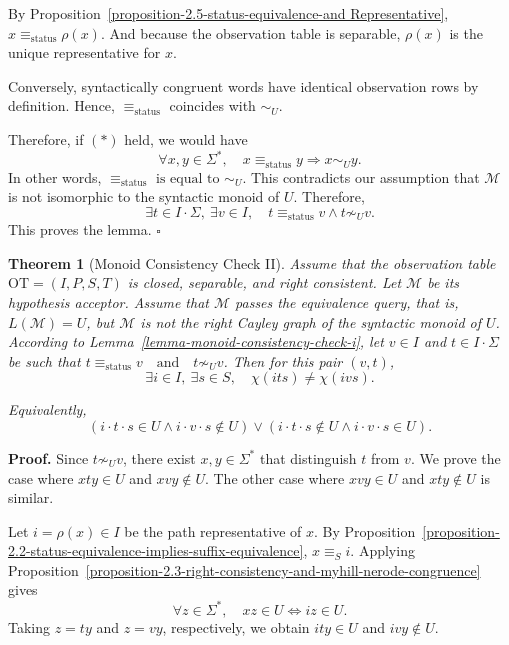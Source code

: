 \documentclass{ieice-tecrep}
\newtheorem{theorem}{Theorem}
\begin{document}
By Proposition~\ref{proposition-2.5-status-equivalence-and Representative}, \(x \equiv_{\mathrm{status}} \rho(x)\). And because the observation table is separable, \(\rho(x)\) is the
unique representative for \(x\).

Conversely, syntactically congruent words have identical observation rows by definition.
Hence, \(\equiv_{\mathrm{status}}\) coincides with \(\sim_U\).

Therefore, if \((*)\) held, we would have
\[
\forall x,y \in \Sigma^*,\quad x \equiv_{\mathrm{status}} y \Longrightarrow x \sim_U y.
\]
In other words, \(\equiv_{\mathrm{status}}\text{ is equal to }\sim_U\). 
This contradicts our assumption that \(\mathcal{M}\) is not isomorphic to the 
syntactic monoid of \(U\). 
Therefore,
\[
\exists t\in I\cdot\Sigma,\ \exists v\in I,\quad
t\equiv_{\mathrm{status}}v\land t\not\sim_U v.
\]
This proves the lemma. \hfill $\square$

\begin{theorem}[Monoid Consistency Check II]\label{theorem-monoid-consistency-check-ii}
Assume that the observation table
\(\mathrm{OT}=(I,P,S,T)\) is closed, separable, and right consistent.
Let \(\mathcal{M}\) be its hypothesis acceptor. Assume that
\(\mathcal{M}\) passes the equivalence query, that is,
\(L(\mathcal{M})=U\), but \(\mathcal{M}\) is not the right Cayley graph
of the syntactic monoid of \(U\). According to Lemma~\ref{lemma-monoid-consistency-check-i}, let
\(v \in I\) and \(t \in I\cdot \Sigma\) be such that \(t \equiv_{\mathrm{status}} v \quad\text{and}\quad t \not\sim_U v\). Then for this pair \((v,t)\),
\[
\exists i \in I,\ \exists s \in S,\quad
\chi(its) \neq \chi(ivs).
\]

Equivalently,
\[
(i \cdot t \cdot s \in U \land i \cdot v \cdot s \notin U)
\vee
(i \cdot t \cdot s \notin U \land i \cdot v \cdot s \in U).
\]
\end{theorem}
\noindent\textbf{Proof.} Since \(t\not\sim_U v\), there exist
\(x,y\in\Sigma^*\) that distinguish \(t\) from \(v\).
We prove the case where \(xty\in U\) and
\(xvy\notin U\).
The other case where \(xvy\in U\) and \(xty\notin U\) is similar.

Let \(i=\rho(x)\in I\) be the path representative of \(x\).
By Proposition~\ref{proposition-2.2-status-equivalence-implies-suffix-equivalence}, \(x\equiv_S i\). Applying Proposition~\ref{proposition-2.3-right-consistency-and-myhill-nerode-congruence} gives
\[
\forall z\in\Sigma^*,\quad xz\in U\Longleftrightarrow iz\in U.
\]
Taking \(z=ty\) and \(z=vy\), respectively, we obtain
\(ity\in U\) and \(ivy\notin U\).
\end{document}
